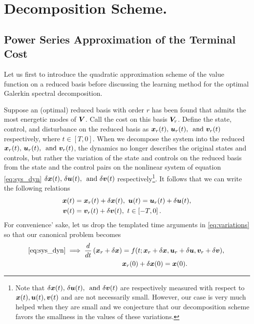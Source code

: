 \section{Decomposition Scheme.}
\label{sec:methods}
\subsection{Power Series Approximation of the Terminal Cost}
%
Let us first to introduce the quadratic approximation scheme of the value function on a reduced basis before discussing the learning method for the optimal Galerkin spectral decomposition. 

Suppose an (optimal) reduced basis with order $r$ has been found that admits the most energetic modes of $\bm{V}$. Call the cost on this basis $\bm{V}_r$. Define the state, control, and disturbance on the reduced basis as $\bm{x}_r(t), \, \bm{u}_r(t), \, \text{ and } \bm{v}_r(t)$ respectively, where $t \in \left[T, 0\right]$. When we decompose the system into the reduced  $\bm{x}_r(t), \, \bm{u}_r(t), \, \text{ and } \bm{v}_r(t)$, the dynamics no longer describes the original states and controls, but rather the variation of the state and controls on the reduced basis from the state and the control pairs on the nonlinear system of equation \eqref{eq:sys_dyn} \ie $\delta \bm{x}(t), \, \delta \bm{u}(t), \,\text{ and } \delta \bm{v}(t)$ respectively\footnote{Note that $\delta \bm{x}(t), \, \delta \bm{u}(t), \,\text{ and } \delta \bm{v}(t)$ are respectively measured with respect to $\bm{x}(t), \bm{u}(t), \bm{v}(t)$ and are not necessarily small. However, our case is very much helped when they are small and we conjecture that our decomposition scheme favors the smallness in the values of these variations.}. It follows that we can write the following relations
%
\begin{subequations}
	\begin{align}
		\bm{x}(t) &= \bm{x}_r(t) + \delta\bm{x}(t), \,\, 	\bm{u}(t) = \bm{u}_r(t) + \delta\bm{u}(t), \\
		\bm{v}(t) &= \bm{v}_r(t) + \delta\bm{v}(t), \,\, t \in \left[-T, 0\right].
	\end{align}
	\label{eq:variations}
\end{subequations}
%
For convenience' sake, let us drop the templated time arguments in \eqref{eq:variations} so that our canonical problem becomes
%
\begin{subequations}
	\begin{align}
		\eqref{eq:sys_dyn} \implies \dfrac{d}{dt}\left(\bm{x}_r + \delta \bm{x}\right) &= f(t; \bm{x}_r + \delta \bm{x}, \bm{u}_r + \delta \bm{u}, \bm{v}_r + \delta \bm{v}), \,  \\
		& \bm{x}_r(0) + \delta \bm{x}(0) = \bm{x}(0).
	\end{align}
\end{subequations}
